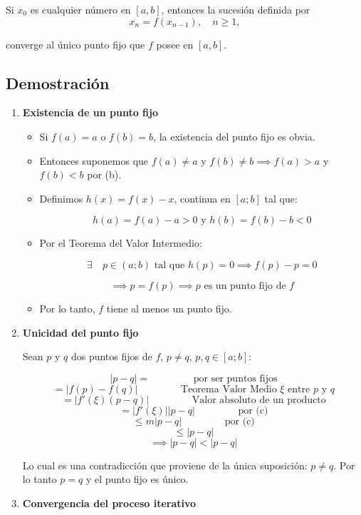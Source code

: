 \documentclass[openany]{book}
\begin{document}
Si \(x_0\) es cualquier número en \([a, b]\), entonces la sucesión definida por
\[ x_n = f(x_{n-1}), \quad n \ge 1,\]

converge al único punto fijo que \(f\) posee en \([a, b]\).

\hypertarget{demostraciuxf3n}{%
\subsection*{Demostración}\label{demostraciuxf3n}}

\begin{enumerate}
\def\labelenumi{\arabic{enumi}.}
\item
  \textbf{Existencia de un punto fijo}

  \begin{itemize}
  \item
    Si \(f(a) = a\) o \(f(b) = b\), la existencia del punto fijo es obvia.
  \item
    Entonces suponemos que \(f(a) \neq a\) y \(f(b) \neq b \implies f(a) > a\) y \(f(b) < b\) por (b).
  \item
    Definimos \(h(x) = f(x) - x\), continua en \([a; b]\) tal que:

    \[h(a) = f(a) - a > 0 \text{ y } h(b) = f(b) - b < 0\]
  \item
    Por el Teorema del Valor Intermedio:

    \[\exists \quad p \in (a; b) \text{ tal que } h(p) = 0 \implies f(p) - p = 0\]

    \[\implies p = f(p) \implies p \text{ es un punto fijo de } f\]
  \item
    Por lo tanto, \(f\) tiene al menos un punto fijo.
  \end{itemize}
\item
  \textbf{Unicidad del punto fijo}

  Sean \(p\) y \(q\) dos puntos fijos de \(f\), \(p \neq q\), \(p, q \in [a; b]\):

  \[ |p-q| = \qquad \qquad \text{ por ser puntos fijos}\]
  \[= | f(p) - f(q) | \qquad \qquad \text{ Teorema Valor Medio } \xi \text{ entre } p \text{ y } q\]
  \[= |f'(\xi) (p - q)| \qquad \qquad \text{ Valor absoluto de un producto} \]
  \[= |f'(\xi)| |p-q| \qquad \qquad \text{ por (c)}\]
  \[\leq m |p-q| \qquad \qquad \text{ por (c)}\]
  \[\leq |p-q|\]
  \[\implies |p-q| < |p-q| \]

  Lo cual es una contradicción que proviene de la única suposición: \(p \neq q\). Por lo tanto \(p = q\) y el punto fijo es único.
\item
  \textbf{Convergencia del proceso iterativo}


\end{enumerate}
\end{document}
